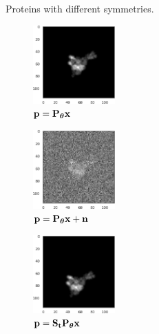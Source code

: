 \begin{figure}[ht!]
\begin{minipage}[b]{0.46\linewidth}
{            Proteins with different symmetries.
        }\label{fig:pdb-proteins}
    \end{minipage}
    \hfill
    \begin{minipage}[b]{0.50\linewidth}
        \centering
        \begin{subfigure}[b]{0.49\linewidth}
            \centering
            \includegraphics[height=3cm]{figures/5j0n_noise0}
            \caption{$\mathbf{p} = \mathbf{P}_{{\boldsymbol{\theta}}} \mathbf{x}$}
            \vspace{0.5em}
        \end{subfigure}
        \hfill
        \begin{subfigure}[b]{0.49\linewidth}
            \centering
            \includegraphics[height=3cm]{figures/5j0n_noise16}
            \caption{$\mathbf{p} = \mathbf{P}_{{\boldsymbol{\theta}}} \mathbf{x} + \mathbf{n}$}
            \vspace{0.5em}
        \end{subfigure}
        \begin{subfigure}[b]{0.49\linewidth}
            \centering
            \includegraphics[height=3cm]{figures/5j0n_translated}
            \caption{$\mathbf{p} = \mathbf{S}_{\mathbf{t}} \mathbf{P}_{{\boldsymbol{\theta}}} \mathbf{x}$}
        \end{subfigure}
        \hfill
        \begin{subfigure}[b]{0.49\linewidth}
            \centering

\end{subfigure}
\end{minipage}
\end{figure}
